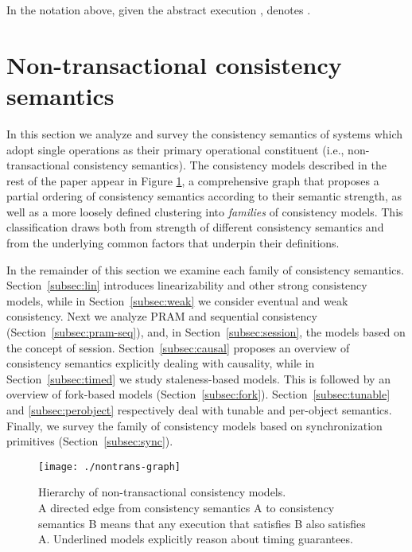 \documentclass[letter, 11pt]{article}
\newcommand{\A}{\ensuremath{A}}
\begin{document}
In the notation above, given the abstract execution ,  denotes .


 \section{Non-transactional consistency semantics}
\label{sec:nontrans}



In this section we analyze and survey the consistency semantics of systems which adopt single operations as their primary  operational constituent (i.e., non-transactional consistency semantics).
The consistency models described in the rest of the paper appear in Figure \ref{fig:non-trans_graph},
a comprehensive graph that proposes a partial ordering of consistency semantics according to their semantic strength, as well as a more loosely defined clustering into \emph{families} of consistency models. This classification draws both from strength of different consistency semantics  and from the underlying common factors that underpin their definitions.

In the remainder of this section we examine each family of consistency semantics.
Section~\ref{subsec:lin} introduces linearizability and other strong consistency models, while in Section~\ref{subsec:weak} we consider eventual and weak consistency.
Next we analyze PRAM and sequential consistency (Section~\ref{subsec:pram-seq}), and, in Section~\ref{subsec:session}, the models based on the concept of session.
Section~\ref{subsec:causal} proposes an overview of consistency semantics explicitly dealing with causality,
while in Section~\ref{subsec:timed} we study staleness-based models. This is followed by an overview of fork-based models (Section~\ref{subsec:fork}).
Section~\ref{subsec:tunable} and \ref{subsec:perobject} respectively deal with tunable and per-object semantics.
Finally, we survey the family of consistency models based on synchronization primitives (Section~\ref{subsec:sync}).
\begin{figure}[!htp]
	\centering
	\texttt{[image: ./nontrans-graph]} 	\caption{\footnotesize Hierarchy of non-transactional consistency models. \\A directed edge from  consistency semantics A to consistency semantics B means that any execution that satisfies B also satisfies A.
	Underlined models explicitly reason about timing guarantees.}
	\label{fig:non-trans_graph}
\end{figure}
\end{document}
